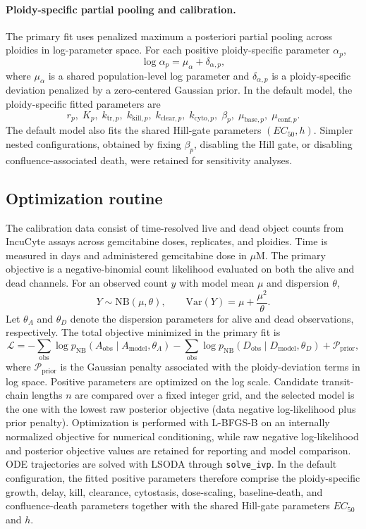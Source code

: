 \paragraph{Ploidy-specific partial pooling and calibration.}
The primary fit uses penalized maximum a posteriori partial pooling across ploidies in log-parameter space. For each positive ploidy-specific parameter $\alpha_p$,
\[
\log \alpha_p=\mu_{\alpha}+\delta_{\alpha,p},
\]
where $\mu_{\alpha}$ is a shared population-level log parameter and $\delta_{\alpha,p}$ is a ploidy-specific deviation penalized by a zero-centered Gaussian prior. In the default model, the ploidy-specific fitted parameters are
\[
r_p,\; K_p,\; k_{\mathrm{tr},p},\; k_{\mathrm{kill},p},\; k_{\mathrm{clear},p},\; k_{\mathrm{cyto},p},\; \beta_p,\; \mu_{\mathrm{base},p},\; \mu_{\mathrm{conf},p}.
\]
The default model also fits the shared Hill-gate parameters $(EC_{50},h)$. Simpler nested configurations, obtained by fixing $\beta_p$, disabling the Hill gate, or disabling confluence-associated death, were retained for sensitivity analyses.

\subsection*{Optimization routine}

The calibration data consist of time-resolved live and dead object counts from IncuCyte assays across gemcitabine doses, replicates, and ploidies. Time is measured in days and administered gemcitabine dose in $\mu$M. The primary objective is a negative-binomial count likelihood evaluated on both the alive and dead channels. For an observed count $y$ with model mean $\mu$ and dispersion $\theta$,
\[
Y\sim\mathrm{NB}(\mu,\theta),
\qquad
\mathrm{Var}(Y)=\mu+\frac{\mu^2}{\theta}.
\]
Let $\theta_A$ and $\theta_D$ denote the dispersion parameters for alive and dead observations, respectively. The total objective minimized in the primary fit is
\[
\mathcal{L}
=
-\sum_{\mathrm{obs}}
\log p_{\mathrm{NB}}\!\left(A_{\mathrm{obs}}\mid A_{\mathrm{model}},\theta_A\right)
-\sum_{\mathrm{obs}}
\log p_{\mathrm{NB}}\!\left(D_{\mathrm{obs}}\mid D_{\mathrm{model}},\theta_D\right)
+\mathcal{P}_{\mathrm{prior}},
\]
where $\mathcal{P}_{\mathrm{prior}}$ is the Gaussian penalty associated with the ploidy-deviation terms in log space. Positive parameters are optimized on the log scale. Candidate transit-chain lengths $n$ are compared over a fixed integer grid, and the selected model is the one with the lowest raw posterior objective (data negative log-likelihood plus prior penalty). Optimization is performed with L-BFGS-B on an internally normalized objective for numerical conditioning, while raw negative log-likelihood and posterior objective values are retained for reporting and model comparison. ODE trajectories are solved with LSODA through \texttt{solve\_ivp}.
In the default configuration, the fitted positive parameters therefore comprise the ploidy-specific growth, delay, kill, clearance, cytostasis, dose-scaling, baseline-death, and confluence-death parameters together with the shared Hill-gate parameters $EC_{50}$ and $h$.

